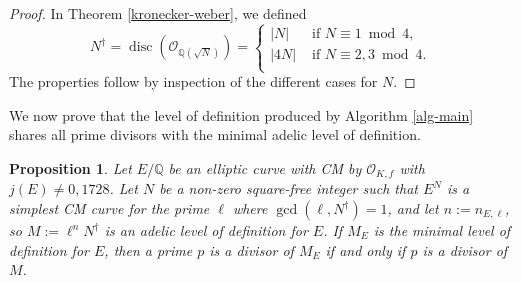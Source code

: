 \documentclass[11pt]{amsart}
\newtheorem{proposition}[defn]{Proposition}
\theoremstyle{definition}
\newcommand{\Q}{\mathbb{Q}}
\newcommand{\Of}{\mathcal{O}_{K,f}}
\DeclareMathOperator{\disc}{disc} %
\begin{document}
\begin{proof}
    In Theorem \ref{kronecker-weber}, we defined 
    \[ N^{\dagger} = \disc(\mathcal{O}_{\Q(\sqrt{N})}) =\begin{cases} |N| & \text{ if } N \equiv 1 \bmod 4, \\
|4N| & \text{ if } N \equiv 2,3 \bmod 4. \\
\end{cases}\]
The properties follow by inspection of the different cases for $N$.



\end{proof}

We now prove that the level of definition produced by Algorithm \ref{alg-main} shares all prime divisors with the minimal adelic level of definition.

\begin{proposition}\label{lem-primediv}
    Let $E/\Q$ be an elliptic curve with CM by $\Of$ with $j(E) \neq 0, 1728$. Let $N$ be a non-zero square-free integer such that $E^N$ is a simplest CM curve for the prime $\ell$ where $\gcd(\ell, N^{\dagger}) = 1$, and let $n := n_{E, \ell}$, so $M := \ell^n N^{\dagger}$ is an adelic level of definition for $E$. If $M_E$ is the minimal level of definition for $E$, then a prime $p$  is a divisor of $M_E$ if and only if $p$ is a divisor of $M$.
\end{proposition}
\end{document}
